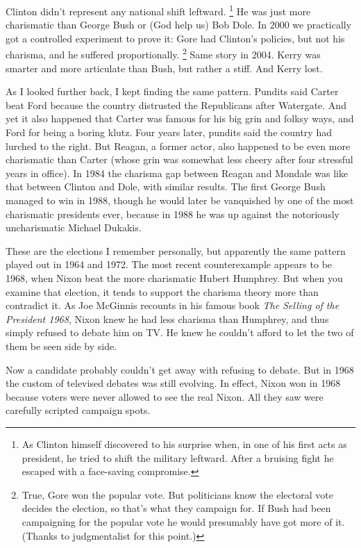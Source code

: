 \documentclass[12pt]{book}
\begin{document}
Clinton didn't represent any national shift leftward.
\footnote{As Clinton himself discovered to his surprise when, in one of
his first acts as president, he tried to shift the military leftward.
After a bruising fight he escaped with a face-saving compromise.} He was just more charismatic than George Bush or
(God help us) Bob Dole. In 2000 we practically got a controlled
experiment to prove it: Gore had Clinton's policies, but not his
charisma, and he suffered proportionally. \footnote{True, Gore won the popular vote. But politicians know the
electoral vote decides the election, so that's what they campaign for.
If Bush had been campaigning for the popular vote he would presumably
have got more of it. (Thanks to judgmentalist for this point.)} Same
story in 2004. Kerry was smarter and more articulate than Bush, but
rather a stiff. And Kerry lost.

As I looked further back, I kept finding the same pattern. Pundits said
Carter beat Ford because the country distrusted the Republicans after
Watergate. And yet it also happened that Carter was famous for his big
grin and folksy ways, and Ford for being a boring klutz. Four years
later, pundits said the country had lurched to the right. But Reagan, a
former actor, also happened to be even more charismatic than Carter
(whose grin was somewhat less cheery after four stressful years in
office). In 1984 the charisma gap between Reagan and Mondale was like
that between Clinton and Dole, with similar results. The first George
Bush managed to win in 1988, though he would later be vanquished by one
of the most charismatic presidents ever, because in 1988 he was up
against the notoriously uncharismatic Michael Dukakis.

These are the elections I remember personally, but apparently the same
pattern played out in 1964 and 1972. The most recent counterexample
appears to be 1968, when Nixon beat the more charismatic Hubert
Humphrey. But when you examine that election, it tends to support the
charisma theory more than contradict it. As Joe McGinnis recounts in his
famous book \emph{The Selling of the President 1968}, Nixon knew he had
less charisma than Humphrey, and thus simply refused to debate him on
TV. He knew he couldn't afford to let the two of them be seen side by
side.

Now a candidate probably couldn't get away with refusing to debate. But
in 1968 the custom of televised debates was still evolving. In effect,
Nixon won in 1968 because voters were never allowed to see the real
Nixon. All they saw were carefully scripted campaign spots.
\end{document}

